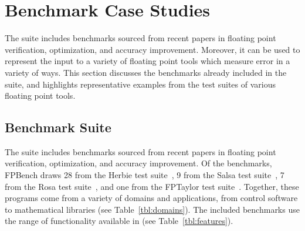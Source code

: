 \documentclass[main.tex]{subfiles}
\begin{document}
\section{Benchmark Case Studies}
\label{sec:casestudies}

The \name suite includes \nbenches benchmarks
  sourced from recent papers in floating point verification,
  optimization, and accuracy improvement.
Moreover, it can be used to represent the input
  to a variety of floating point tools
  which measure error in a variety of ways.
This section discusses the benchmarks
  already included in the \name suite,
  and highlights representative examples
  from the test suites of various floating point tools.

\subsection{Benchmark Suite}

The \name suite includes \nbenches benchmarks
  sourced from recent papers in floating point verification,
  optimization, and accuracy improvement.
Of the benchmarks,
  FPBench draws 28 from the Herbie test suite~\cite{pavel15},
  9 from the Salsa test suite~\cite{fmics15},
  7 from the Rosa test suite~\cite{DarulovaK14},
  and one from the FPTaylor test suite~\cite{fptaylor-fm15}.
Together, these programs come from
  a variety of domains and applications,
  from control software to mathematical libraries
  (see Table~\ref{tbl:domains}).
The included benchmarks use the range of functionality
  available in \name (see Table~\ref{tbl:features}).
\end{document}
